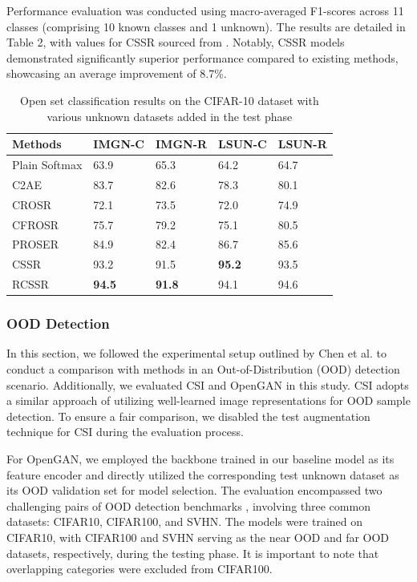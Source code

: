\documentclass{gji}
\begin{document}
Performance evaluation was conducted using macro-averaged F1-scores across 11 classes (comprising 10 known classes and 1 unknown). The results are detailed in Table 2, with values for CSSR sourced from \cite{36}. Notably, CSSR models demonstrated significantly superior performance compared to existing methods, showcasing an average improvement of 8.7\%.

     \begin{table}
 \begin{minipage}{65mm}
\caption{Open set classification results on the CIFAR-10 dataset with various unknown datasets added in the test phase}
\label{anymode}
\begin{tabular}{|@{}l|l|l|l|l|} \hline  
Methods& IMGN-C& IMGN-R& LSUN-C& LSUN-R\\ \hline  

Plain Softmax& 63.9& 65.3&
  64.2& 64.7\\[2pt] \hline  
C2AE\cite{26}& 83.7&82.6&
  78.3& 80.1\\[1.5pt] \hline  
CROSR\cite{10}& 72.1& 73.5&
  72.0& 74.9\\[1.5pt] \hline  
CFROSR\cite{28}& 75.7& 79.2&
  75.1& 80.5\\[1.5pt] \hline  
PROSER\cite{48}& 84.9& 82.4&
  86.7& 85.6\\[1.5pt] \hline  
CSSR& 93.2& 91.5&
  \bf{95.2}& 93.5\\[1.5pt] \hline  
RCSSR& \bf{94.5}& \bf{91.8}&
  94.1& 94.6\\[1.5pt] \hline 
\end{tabular}

\end{minipage}
\end{table}
    
\subsubsection{OOD Detection}  

 In this section, we followed the experimental setup outlined by Chen et al. \cite{3} to conduct a comparison with methods in an Out-of-Distribution (OOD) detection scenario. Additionally, we evaluated CSI \cite{38} and OpenGAN \cite{19} in this study. CSI adopts a similar approach of utilizing well-learned image representations for OOD sample detection. To ensure a fair comparison, we disabled the test augmentation technique for CSI during the evaluation process.

For OpenGAN, we employed the backbone trained in our baseline model as its feature encoder and directly utilized the corresponding test unknown dataset as its OOD validation set for model selection. The evaluation encompassed two challenging pairs of OOD detection benchmarks \cite{15}, involving three common datasets: CIFAR10, CIFAR100, and SVHN. The models were trained on CIFAR10, with CIFAR100 and SVHN serving as the near OOD and far OOD datasets, respectively, during the testing phase. It is important to note that overlapping categories were excluded from CIFAR100.
\end{document}
